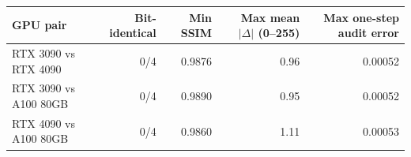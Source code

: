 \begin{tabular}{@{}lrrrr@{}}
\toprule
\textbf{GPU pair} & \textbf{Bit-identical} & \textbf{Min SSIM} & \textbf{Max mean $|\Delta|$ (0--255)} & \textbf{Max one-step audit error} \\
\midrule
RTX 3090 vs RTX 4090 & 0/4 & 0.9876 & 0.96 & 0.00052 \\
RTX 3090 vs A100 80GB & 0/4 & 0.9890 & 0.95 & 0.00052 \\
RTX 4090 vs A100 80GB & 0/4 & 0.9860 & 1.11 & 0.00053 \\
\bottomrule
\end{tabular}
